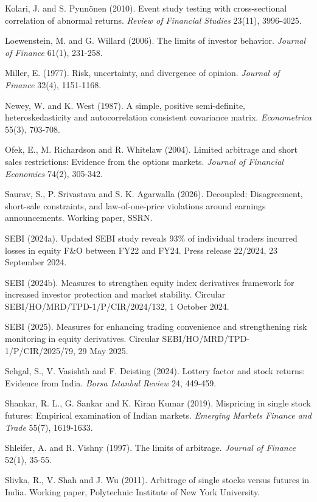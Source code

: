 \begin{description}[leftmargin=1.2em,itemsep=1pt,font=\normalfont]
\item Kolari, J. and S. Pynn\"onen (2010). Event study testing with cross-sectional correlation of abnormal returns. \emph{Review of Financial Studies} 23(11), 3996-4025.
\item Loewenstein, M. and G. Willard (2006). The limits of investor behavior. \emph{Journal of Finance} 61(1), 231-258.
\item Miller, E. (1977). Risk, uncertainty, and divergence of opinion. \emph{Journal of Finance} 32(4), 1151-1168.
\item Newey, W. and K. West (1987). A simple, positive semi-definite, heteroskedasticity and autocorrelation consistent covariance matrix. \emph{Econometrica} 55(3), 703-708.
\item Ofek, E., M. Richardson and R. Whitelaw (2004). Limited arbitrage and short sales restrictions: Evidence from the options markets. \emph{Journal of Financial Economics} 74(2), 305-342.
\item Saurav, S., P. Srivastava and S. K. Agarwalla (2026). Decoupled: Disagreement, short-sale constraints, and law-of-one-price violations around earnings announcements. Working paper, SSRN.
\item SEBI (2024a). Updated SEBI study reveals 93\% of individual traders incurred losses in equity F\&O between FY22 and FY24. Press release 22/2024, 23 September 2024.
\item SEBI (2024b). Measures to strengthen equity index derivatives framework for increased investor protection and market stability. Circular SEBI/HO/MRD/TPD-1/P/CIR/2024/132, 1 October 2024.
\item SEBI (2025). Measures for enhancing trading convenience and strengthening risk monitoring in equity derivatives. Circular SEBI/HO/MRD/TPD-1/P/CIR/2025/79, 29 May 2025.
\item Sehgal, S., V. Vasishth and F. Deisting (2024). Lottery factor and stock returns: Evidence from India. \emph{Borsa Istanbul Review} 24, 449-459.
\item Shankar, R. L., G. Sankar and K. Kiran Kumar (2019). Mispricing in single stock futures: Empirical examination of Indian markets. \emph{Emerging Markets Finance and Trade} 55(7), 1619-1633.
\item Shleifer, A. and R. Vishny (1997). The limits of arbitrage. \emph{Journal of Finance} 52(1), 35-55.
\item Slivka, R., V. Shah and J. Wu (2011). Arbitrage of single stocks versus futures in India. Working paper, Polytechnic Institute of New York University.

\end{description}
